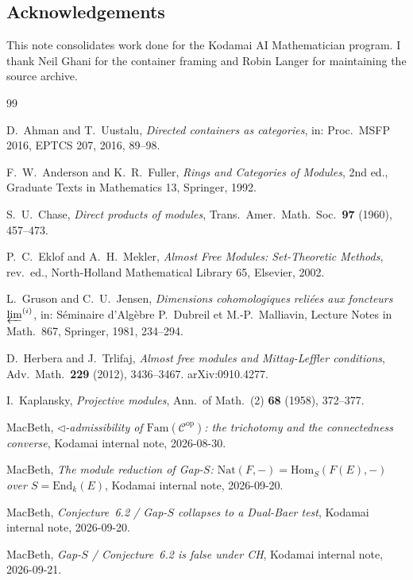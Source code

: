 \documentclass[11pt,reqno]{amsart}
\theoremstyle{plain}
\theoremstyle{definition}
\theoremstyle{remark}
\newcommand{\Fam}{\mathrm{Fam}}
\newcommand{\End}{\mathrm{End}}
\newcommand{\Hom}{\mathrm{Hom}}
\newcommand{\Nat}{\mathrm{Nat}}
\newcommand{\op}{\mathrm{op}}
\newcommand{\tri}{\triangleleft}
\newcommand{\C}{\mathcal{C}}
\begin{document}
\subsection*{Acknowledgements}
This note consolidates work done for the Kodamai AI Mathematician program. I thank Neil Ghani for the container framing and Robin Langer for maintaining the source archive.

\begin{thebibliography}{99}

 D.~Ahman and T.~Uustalu, \emph{Directed containers as categories}, in: Proc.\ MSFP 2016, EPTCS 207, 2016, 89--98.

 F.~W.~Anderson and K.~R.~Fuller, \emph{Rings and Categories of Modules}, 2nd ed., Graduate Texts in Mathematics 13, Springer, 1992.

 S.~U.~Chase, \emph{Direct products of modules}, Trans.\ Amer.\ Math.\ Soc.\ \textbf{97} (1960), 457--473.

 P.~C.~Eklof and A.~H.~Mekler, \emph{Almost Free Modules: Set-Theoretic Methods}, rev.\ ed., North-Holland Mathematical Library 65, Elsevier, 2002.

 L.~Gruson and C.~U.~Jensen, \emph{Dimensions cohomologiques reli\'ees aux foncteurs $\varprojlim^{(i)}$}, in: S\'eminaire d'Alg\`ebre P.~Dubreil et M.-P.~Malliavin, Lecture Notes in Math.\ 867, Springer, 1981, 234--294.

 D.~Herbera and J.~Trlifaj, \emph{Almost free modules and Mittag-Leffler conditions}, Adv.\ Math.\ \textbf{229} (2012), 3436--3467. arXiv:0910.4277.

 I.~Kaplansky, \emph{Projective modules}, Ann.\ of Math.\ (2) \textbf{68} (1958), 372--377.

 MacBeth, \emph{$\tri$-admissibility of $\Fam(\C^{\op})$: the trichotomy and the connectedness converse}, Kodamai internal note, 2026-08-30.

 MacBeth, \emph{The module reduction of Gap-$S$: $\Nat(F,-)=\Hom_S(F(E),-)$ over $S=\End_k(E)$}, Kodamai internal note, 2026-09-20.

 MacBeth, \emph{Conjecture~6.2 / Gap-$S$ collapses to a Dual-Baer test}, Kodamai internal note, 2026-09-20.

 MacBeth, \emph{Gap-$S$ / Conjecture~6.2 is false under CH}, Kodamai internal note, 2026-09-21.


\end{thebibliography}
\end{document}

